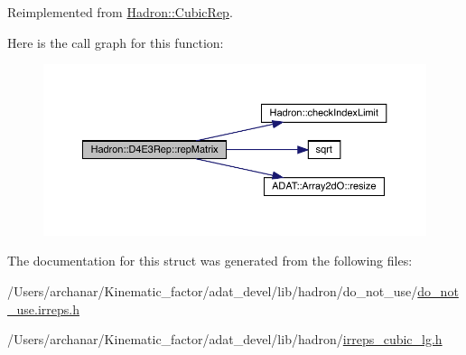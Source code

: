 Reimplemented from \mbox{\hyperlink{structHadron_1_1CubicRep_ac5d7e9e6f4ab1158b5fce3e4ad9e8005}{Hadron\+::\+Cubic\+Rep}}.

Here is the call graph for this function\+:
\nopagebreak
\begin{figure}[H]
\begin{center}
\leavevmode
\includegraphics[width=350pt]{dc/d81/structHadron_1_1D4E3Rep_a313affd6d58648cb82e7095ada7afa8d_cgraph}
\end{center}
\end{figure}


The documentation for this struct was generated from the following files\+:\begin{DoxyCompactItemize}
\item 
/\+Users/archanar/\+Kinematic\+\_\+factor/adat\+\_\+devel/lib/hadron/do\+\_\+not\+\_\+use/\mbox{\hyperlink{do__not__use_8irreps_8h}{do\+\_\+not\+\_\+use.\+irreps.\+h}}\item 
/\+Users/archanar/\+Kinematic\+\_\+factor/adat\+\_\+devel/lib/hadron/\mbox{\hyperlink{lib_2hadron_2irreps__cubic__lg_8h}{irreps\+\_\+cubic\+\_\+lg.\+h}}\end{DoxyCompactItemize}
